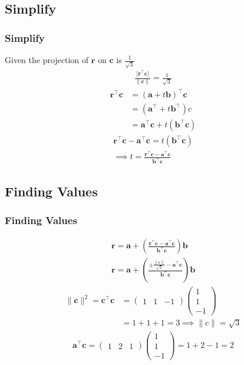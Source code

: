 \documentclass{beamer}
\providecommand{\brak}[1]{\ensuremath{\left(#1\right)}}
\theoremstyle{remark}
\providecommand{\norm}[1]{\lVert#1\rVert}
\newcommand{\myvec}[1]{\ensuremath{\begin{pmatrix}#1\end{pmatrix}}}
\let\vec\mathbf
\numberwithin{equation}{section}
\begin{document}
\subsection{Simplify}
\begin{frame}
\frametitle{Simplify}
Given the projection of $\vec{r}$ on $\vec{c}$ is $\frac{1}{\sqrt{3}}$
\begin{align}
\frac{|\vec{r}^\top\vec{c}|}{\norm{\vec{c}}} = \frac{1}{\sqrt{3}} 
\end{align}
\begin{align}
\vec{r}^\top\vec{c}&=\brak{\vec{a}+t\vec{b}}^\top\vec{c}\\
&=\brak{\vec{a}^\top+t\vec{b}^\top}c \\
&=\vec{a}^\top\vec{c}+t\brak{\vec{b}^\top\vec{c}} 
\end{align}
\begin{align}
\vec{r}^\top\vec{c}-\vec{a}^\top\vec{c}=t\brak{\vec{b}^\top\vec{c}}  \\
\implies t=\frac{\vec{r}^\top\vec{c}-\vec{a}^\top\vec{c}}{\vec{b}^\top\vec{c}}
\end{align}
\end{frame}
\subsection{Finding Values}
\begin{frame}
\frametitle{Finding Values}
\begin{align}
    \vec{r}=\vec{a}+\brak{\frac{\vec{r}^\top\vec{c}-\vec{a}^\top\vec{c}}{\vec{b}^\top\vec{c}}}\vec{b} \\
    \vec{r}=\vec{a}+\brak{\frac{\pm\frac{\norm{\vec{c}}}{\sqrt{3}}-\vec{a}^\top\vec{c}}{\vec{b}^\top\vec{c}}}\vec{b}
\end{align}
\begin{align}
\norm{\vec{c}}^2=\vec{c}^\top\vec{c}&=\myvec{1&1&-1}\myvec{1\\1\\-1} \\
&=1+1+1=3  \implies \norm{c}=\sqrt{3}
\end{align} 
\begin{align}
\vec{a}^\top\vec{c}=\myvec{1&2&1}\myvec{1\\1\\-1}=1+2-1=2 
\end{align}
\end{frame}
\end{document}
